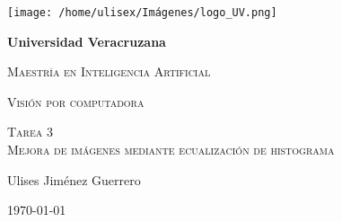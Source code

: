 \begin{titlepage}
	\centering
	{\texttt{[image: /home/ulisex/Imágenes/logo\_UV.png]}\par}
	\vspace{1cm}
	{\bfseries\LARGE Universidad Veracruzana \par}
	\vspace{1cm}
	{\scshape\Large Maestría en Inteligencia Artificial \par}
	{\scshape\Large Visión por computadora \par}
	\vspace{3cm}
	{\scshape\Large Tarea 3 \\
		Mejora de imágenes mediante ecualización de histograma\par} 
	\vspace{3cm}
	{\itshape\Large  \par}
	\vfill
	{\Large Ulises Jiménez Guerrero\par}
	\vfill		
	{\Large \today \par}
\end{titlepage} 
